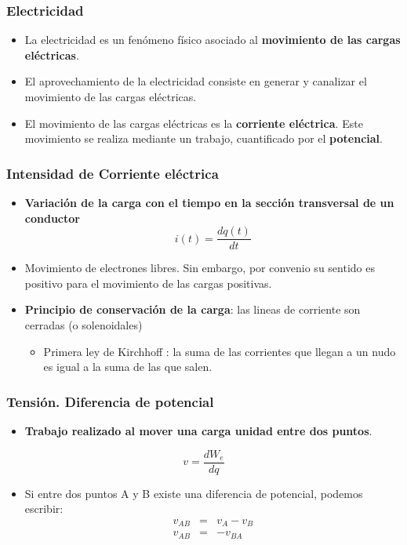 \documentclass[serif, xcolor=dvipsnames]{beamer}
\begin{document}
\begin{frame}
  \frametitle{Electricidad}
  \begin{itemize}
  \item La electricidad es un fenómeno físico asociado al
    \textbf{movimiento de las cargas eléctricas}.
  \item El aprovechamiento de la electricidad consiste en generar y
    canalizar el movimiento de las cargas eléctricas.
  \item El movimiento de las cargas eléctricas es la \textbf{corriente
      eléctrica}.  Este movimiento se realiza mediante un trabajo,
    cuantificado por el \textbf{potencial}.
  \end{itemize}

\end{frame}
\begin{frame}
  \frametitle{Intensidad de Corriente eléctrica}
  \begin{itemize}
  \item \textbf{Variación de la carga con el tiempo en la sección
      transversal de un conductor}
    \[
    i(t)=\frac{dq(t)}{dt}
    \]

  \item Movimiento de electrones libres. Sin embargo, por convenio su
    sentido es positivo para el movimiento de las cargas positivas.
  \item \textbf{Principio de conservación de la carga}: las lineas de
    corriente son cerradas (o solenoidales)

    \begin{itemize}
    \item Primera ley de Kirchhoff : la suma de las corrientes que
      llegan a un nudo es igual a la suma de las que salen.
    \end{itemize}
  \end{itemize}

\end{frame}
\begin{frame}
  \frametitle{Tensión. Diferencia de potencial}
  \begin{itemize}
  \item \textbf{Trabajo realizado al mover una carga unidad entre dos
      puntos}.
  \end{itemize}
  \[
  v=\frac{dW_{e}}{dq}
  \]

  \begin{itemize}
  \item Si entre dos puntos A y B existe una diferencia de potencial,
    podemos escribir:
    \begin{eqnarray*}
      v_{AB} & = & v_{A}-v_{B}\\
      v_{AB} & = & -v_{BA}
    \end{eqnarray*}

  \end{itemize}

\end{frame}
\end{document}
